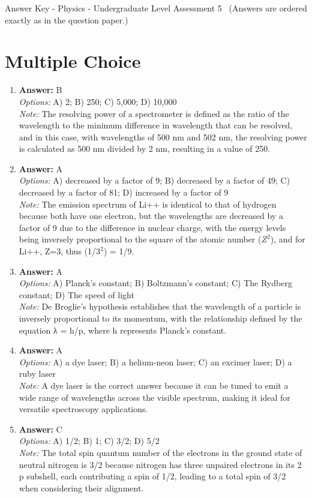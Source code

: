 \documentclass[12pt]{article}
\begin{document}
\begin{center}
Answer Key - Physics - Undergraduate Level Assessment 5 \
\small (Answers are ordered exactly as in the question paper.)
\end{center}

\section*{Multiple Choice}
\begin{enumerate}[label=\arabic*.]
\item \textbf{Answer:} B
\\ \textit{Options:} A) 2; B) 250; C) 5,000; D) 10,000
\\ \textit{Note:} The resolving power of a spectrometer is defined as the ratio of the wavelength to the minimum difference in wavelength that can be resolved, and in this case, with wavelengths of 500 nm and 502 nm, the resolving power is calculated as 500 nm divided by 2 nm, resulting in a value of 250.
\item \textbf{Answer:} A
\\ \textit{Options:} A) decreased by a factor of 9; B) decreased by a factor of 49; C) decreased by a factor of 81; D) increased by a factor of 9
\\ \textit{Note:} The emission spectrum of Li++ is identical to that of hydrogen because both have one electron, but the wavelengths are decreased by a factor of 9 due to the difference in nuclear charge, with the energy levels being inversely proportional to the square of the atomic number ($Z^2$), and for Li++, Z=3, thus (1/$3^2$) = 1/9.
\item \textbf{Answer:} A
\\ \textit{Options:} A) Planck's constant; B) Boltzmann's constant; C) The Rydberg constant; D) The speed of light
\\ \textit{Note:} De Broglie's hypothesis establishes that the wavelength of a particle is inversely proportional to its momentum, with the relationship defined by the equation λ = h/p, where h represents Planck's constant.
\item \textbf{Answer:} A
\\ \textit{Options:} A) a dye laser; B) a helium-neon laser; C) an excimer laser; D) a ruby laser
\\ \textit{Note:} A dye laser is the correct answer because it can be tuned to emit a wide range of wavelengths across the visible spectrum, making it ideal for versatile spectroscopy applications.
\item \textbf{Answer:} C
\\ \textit{Options:} A) 1/2; B) 1; C) 3/2; D) 5/2
\\ \textit{Note:} The total spin quantum number of the electrons in the ground state of neutral nitrogen is 3/2 because nitrogen has three unpaired electrons in its 2 p subshell, each contributing a spin of 1/2, leading to a total spin of 3/2 when considering their alignment.
\end{enumerate}
\end{document}
